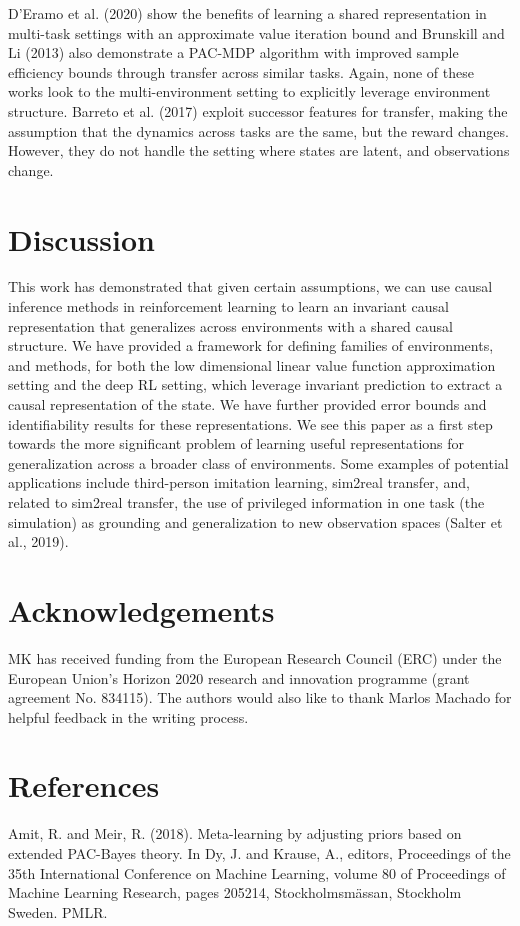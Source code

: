 \documentclass[10pt]{article}
\begin{document}
D'Eramo et al. (2020) show the benefits of learning a shared representation in multi-task settings with an approximate value iteration bound and Brunskill and $\mathrm{Li}$ (2013) also demonstrate a PAC-MDP algorithm with improved sample efficiency bounds through transfer across similar tasks. Again, none of these works look to the multi-environment setting to explicitly leverage environment structure. Barreto et al. (2017) exploit successor features for transfer, making the assumption that the dynamics across tasks are the same, but the reward changes. However, they do not handle the setting where states are latent, and observations change.

\section{Discussion}
This work has demonstrated that given certain assumptions, we can use causal inference methods in reinforcement learning to learn an invariant causal representation that generalizes across environments with a shared causal structure. We have provided a framework for defining families of environments, and methods, for both the low dimensional linear value function approximation setting and the deep RL setting, which leverage invariant prediction to extract a causal representation of the state. We have further provided error bounds and identifiability results for these representations. We see this paper as a first step towards the more significant problem of learning useful representations for generalization across a broader class of environments. Some examples of potential applications include third-person imitation learning, sim2real transfer, and, related to sim2real transfer, the use of privileged information in one task (the simulation) as grounding and generalization to new observation spaces (Salter et al., 2019).

\section{Acknowledgements}
MK has received funding from the European Research Council (ERC) under the European Union's Horizon 2020 research and innovation programme (grant agreement No. 834115). The authors would also like to thank Marlos Machado for helpful feedback in the writing process.

\section{References}
Amit, R. and Meir, R. (2018). Meta-learning by adjusting priors based on extended PAC-Bayes theory. In Dy, J. and Krause, A., editors, Proceedings of the 35th International Conference on Machine Learning, volume 80 of Proceedings of Machine Learning Research, pages 205214, Stockholmsmässan, Stockholm Sweden. PMLR.
\end{document}
